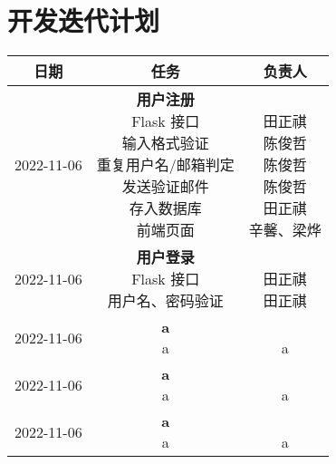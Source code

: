 \section{开发迭代计划}

\begin{table}[h!]
    \centering
    \begin{tabular}{ccc}\toprule
        \textbf{日期} & \textbf{任务} & \textbf{负责人} \\\midrule
        2022-11-06 & \makecell[l]{\textbf{用户注册} \\
            Flask 接口 \\
            输入格式验证 \\
            重复用户名/邮箱判定 \\
            发送验证邮件 \\
            存入数据库 \\
            前端页面
        } & \makecell{ \\
            田正祺 \\
            陈俊哲 \\
            陈俊哲 \\
            陈俊哲 \\
            田正祺 \\
            辛馨、梁烨
        } \\\midrule
        2022-11-06 & \makecell[l]{\textbf{用户登录} \\
            Flask 接口 \\
            用户名、密码验证 \\
        } & \makecell{ \\
            田正祺 \\
            田正祺 \\
        } \\\midrule
        2022-11-06 & \makecell[l]{\textbf{a} \\
            a
        } & \makecell{ \\
            a
        } \\\midrule
        2022-11-06 & \makecell[l]{\textbf{a} \\
            a
        } & \makecell{ \\
            a
        } \\\midrule
        2022-11-06 & \makecell[l]{\textbf{a} \\
            a
        } & \makecell{ \\
            a
        } \\\midrule
        \bottomrule
    \end{tabular}
\end{table}